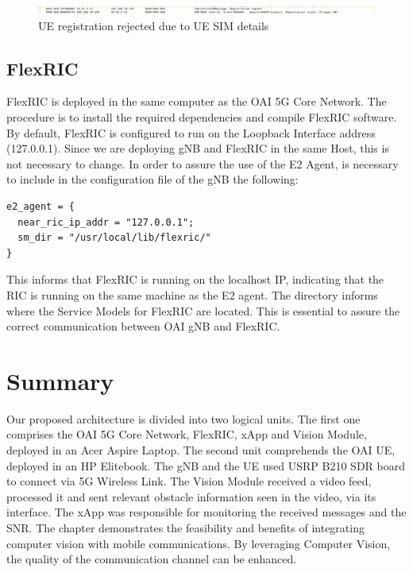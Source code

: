 \begin{figure}[H]
    \centering
    \includegraphics[width=\linewidth]{figures/Ue_fail}
    \caption{UE registration rejected due to UE SIM details}
    \label{fig:UE_failure}
\end{figure}

\subsection{FlexRIC}\label{subsec:flexric}
FlexRIC is deployed in the same computer as the OAI 5G Core Network.
The procedure is to install the required dependencies and compile FlexRIC software.
By default, FlexRIC is configured to run on the Loopback Interface address (127.0.0.1).
Since we are deploying gNB and FlexRIC in the same Host, this is not necessary to change.
In order to assure the use of the E2 Agent, is necessary to include in the configuration file of the gNB the following:

\begin{verbatim}
e2_agent = {
  near_ric_ip_addr = "127.0.0.1";
  sm_dir = "/usr/local/lib/flexric/"
}
\end{verbatim}

This informs that FlexRIC is running on the localhost IP, indicating that the RIC is running on the same machine as the E2 agent.
The directory informs where the Service Models for FlexRIC are located.
This is essential to assure the correct communication between OAI gNB and FlexRIC\@.



\section{Summary}\label{sec:summary}
Our proposed architecture is divided into two logical units.
The first one comprises the OAI 5G Core Network, FlexRIC, xApp and Vision Module, deployed in an Acer Aspire Laptop.
The second unit comprehends the OAI UE, deployed in an HP Elitebook.
The gNB and the UE used USRP B210 SDR board to connect via 5G Wireless Link.
The Vision Module received a video feed, processed it and sent relevant obstacle information seen in the video, via its interface.
The xApp was responsible for monitoring the received messages and the SNR.
The chapter demonstrates the feasibility and benefits of integrating computer vision with mobile communications.
By leveraging Computer Vision, the quality of the communication channel can be enhanced.






